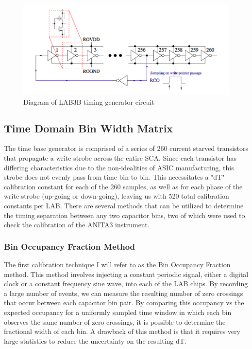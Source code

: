 \noindent		
\begin{figure}
	\includegraphics[width=\textwidth]{figures/LAB3BTimingGenerator}
	\caption{Diagram of LAB3B timing generator circuit\cite{LABASICPAPER} }
	\label{fig:timingGenerator}
\end{figure}

	\subsection{Time Domain Bin Width Matrix}
		The time base generator is comprised of a series of 260 current starved transistors that propagate a write strobe across the entire SCA.  Since each transistor has differing characteristics due to the non-idealities of ASIC manufacturing, this strobe does not evenly pass from time bin to bin.  This necessitates a "dT" calibration constant for each of the 260 samples, as well as for each phase of the write strobe (up-going or down-going), leaving us with 520 total calibration constants per LAB.  There are several methods that can be utilized to determine the timing separation between any two capacitor bins, two of which were used to check the calibration of the ANITA3 instrument.
		
	\subsubsection{Bin Occupancy Fraction Method}
		
		The first calibration technique I will refer to as the Bin Occupancy Fraction method.  This method involves injecting a constant periodic signal, either a digital clock or a constant frequency sine wave, into each of the LAB chips.  By recording a large number of events, we can measure the resulting number of zero crossings that occur between each capacitor bin pair.  By comparing this occupancy vs the expected occupancy for a uniformly sampled time window in which each bin observes the same number of zero crossings, it is possible to determine the fractional width of each bin.  A drawback of this method is that it requires very large statistics to reduce the uncertainty on the resulting dT.  
		
